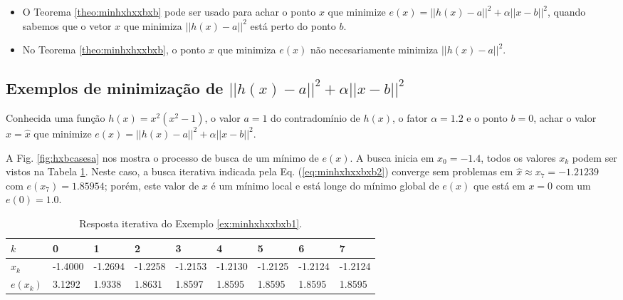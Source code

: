 \begin{tcbattention}
\begin{itemize}
\item O Teorema \ref{theo:minhxhxxbxb} pode ser usado para achar o ponto $x$
que minimize $e(x)=||h(x)-a||^2+\alpha||x-b||^2$,
quando sabemos que o vetor $x$ que minimiza $||h(x)-a||^2$ 
está perto do ponto $b$.
\item No Teorema \ref{theo:minhxhxxbxb}, o ponto $x$ que minimiza $e(x)$ 
não necesariamente minimiza  $||h(x)-a||^2$.
\end{itemize}
\end{tcbattention}


\subsection{Exemplos de minimização de $||h(x)-a||^2+\alpha ||x-b||^2$}


\begin{example}\label{ex:minhxhxxbxb1}
Conhecida uma função $h(x)=x^2(x^2-1)$, o valor $a=1$ do contradomínio de $h(x)$,
o fator $\alpha=1.2$ e o ponto $b=0$,
achar o valor $x=\hat{x}$ que minimize $e(x)=||h(x)-a||^2+\alpha||x-b||^2$.
\end{example}
\begin{SolutionT}\label{sol:minhxhxxbxb1}


 A Fig. \ref{fig:hxbcasesa} nos mostra o processo de busca de um mínimo
 de $e(x)$. A busca inicia em $x_0=-1.4$,
 todos os valores $x_{k}$ podem ser vistos na Tabela \ref{tab:hxbcases1}. 
Neste caso, a busca iterativa indicada pela Eq. (\ref{eq:minhxhxxbxb2}) converge sem problemas 
em $\hat{x}\approx x_7 =-1.21239$ com $e(x_7)=1.85954$; porém, 
 este valor de $x$ é um mínimo local e está longe do mínimo
 global de  $e(x)$ que está em $x=0$ com um $e(0)=1.0$.

\end{SolutionT}



\begin{table}[!h]
\centering
\begin{tabular}{|l|l|l|l|l|l|l|l|l|}
\hline
$k$      & 0 & 1 & 2 & 3 & 4 & 5 & 6 & 7 \\ \hline
$x_k$    & -1.4000 & -1.2694 & -1.2258 & -1.2153 & -1.2130 & -1.2125 & -1.2124 & -1.2124 \\ \hline
$e(x_k)$ & 3.1292 & 1.9338 & 1.8631 & 1.8597 & 1.8595 & 1.8595 & 1.8595 & 1.8595 \\ \hline
\end{tabular}
\caption{Resposta iterativa do Exemplo \ref{ex:minhxhxxbxb1}.}
\label{tab:hxbcases1}
\end{table}

